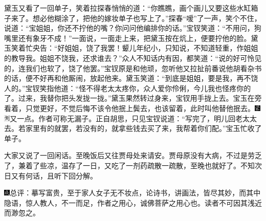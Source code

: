 黛玉又看了一回单子，笑着拉探春悄悄的道：``你瞧瞧，画个画儿又要这些水缸箱子来了。想必他糊涂了，把他的嫁妆单子也写上了。''探春``嗳''了一声，笑个不住，说道：``宝姐姐，你还不拧他的嘴？你问问他编排你的话。''宝钗笑道：``不用问，狗嘴里还有象牙不成！''一面说，一面走上来，把黛玉按在炕上，便要拧他的脸。黛玉笑着忙央告：``好姐姐，饶了我罢！颦儿年纪小，只知说，不知道轻重，作姐姐的教导我。姐姐不饶我，还求谁去？''众人不知话内有因，都笑道：``说的好可怜见的，连我们也软了，饶了他罢。''宝钗原是和他顽，忽听他又拉扯前番说他胡看杂书的话，便不好再和他厮闹，放起他来。黛玉笑道：``到底是姐姐，要是我，再不饶人的。''宝钗笑指他道：``怪不得老太太疼你，众人爱你伶俐，今儿我也怪疼你的了。过来，我替你把头发拢一拢。''黛玉果然转过身来，宝钗用手拢上去。宝玉在旁看着，只觉更好，不觉后悔不该令他抿上鬓去，也该留着，此时叫他替他抿去。{\includegraphics[width=3mm]{../Images/00006}\includegraphics[width=3mm]{../Images/00011}\footnotesize \kaishu 又一点。作者可称无漏子。}正自胡思，只见宝钗说道：``写完了，明儿回老太太去。若家里有的就罢，若没有的，就拿些钱去买了来，我帮着你们配。''宝玉忙收了单子。

大家又说了一回闲话。至晚饭后又往贾母处来请安。贾母原没有大病，不过是劳乏了，兼着了些凉，温存了一日，又吃了一剂药疏散一疏散，至晚也就好了。不知次日又有何话，且听下回分解。

{\includegraphics[width=3mm]{../Images/00005}总评：摹写富贵，至于家人女子无不妆点，论诗书，讲画法，皆尽其妙，而其中隐语，惊人教人，不一而足，作者之用心，诚佛菩萨之用心也。读者不可因其浅近而渺忽之。}
